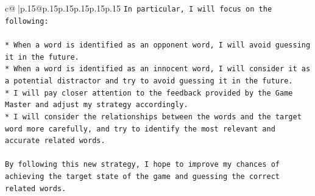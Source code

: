 \documentclass{article}
\begin{document}
{\begin{supertabular}{c@{$\;$}|p{.15\linewidth}@{}p{.15\linewidth}p{.15\linewidth}p{.15\linewidth}p{.15\linewidth}p{.15\linewidth}}
{{{\texttt{In particular, I will focus on the following:} \\
\\ 
\texttt{* When a word is identified as an opponent word, I will avoid guessing it in the future.} \\
\texttt{* When a word is identified as an innocent word, I will consider it as a potential distractor and try to avoid guessing it in the future.} \\
\texttt{* I will pay closer attention to the feedback provided by the Game Master and adjust my strategy accordingly.} \\
\texttt{* I will consider the relationships between the words and the target word more carefully, and try to identify the most relevant and accurate related words.} \\
\\ 
\texttt{By following this new strategy, I hope to improve my chances of achieving the target state of the game and guessing the correct related words.} \\
            }
        }
    }
     \\ \\

\end{supertabular}
}
\end{document}
